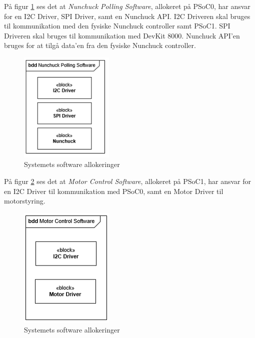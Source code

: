 På figur \ref{fig:NunchuckPollingAllocationClasses} ses det at \textit{Nunchuck Polling Software}, allokeret på PSoC0, har ansvar for en I2C Driver, SPI Driver, samt en Nunchuck API. I2C Driveren skal bruges til kommunikation med den fysiske Nunchuck controller samt PSoC1. SPI Driveren skal bruges til kommunikation med DevKit 8000. Nunchuck API'en bruges for at tilgå data'en fra den fysiske Nunchuck controller.

\begin{figure}[H]
	\centering
	\includegraphics[width=0.4\textwidth]{SystemArkitektur/images/NunchukPollingAllocationClasses.PNG}
	\caption{Systemets software allokeringer}
	\label{fig:NunchuckPollingAllocationClasses}
\end{figure}

På figur \ref{fig:MotorControlAllocationClasses} ses det at \textit{Motor Control Software}, allokeret på PSoC1, har ansvar for en I2C Driver til kommunikation med PSoC0, samt en Motor Driver til motorstyring.

\begin{figure}[H]
	\centering
	\includegraphics[width=0.4\textwidth]{SystemArkitektur/images/MotorControlAllocationClasses.PNG}
	\caption{Systemets software allokeringer}
	\label{fig:MotorControlAllocationClasses}
\end{figure}

